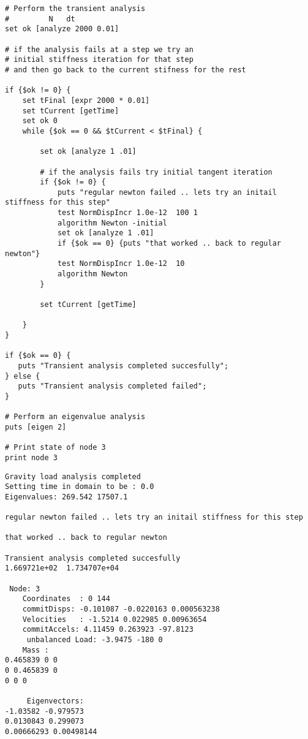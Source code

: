 \documentclass[12pt]{article}
\begin{document}
{\begin{verbatim}
# Perform the transient analysis
#         N   dt
set ok [analyze 2000 0.01]

# if the analysis fails at a step we try an
# initial stiffness iteration for that step
# and then go back to the current stifness for the rest

if {$ok != 0} {
    set tFinal [expr 2000 * 0.01]
    set tCurrent [getTime]
    set ok 0
    while {$ok == 0 && $tCurrent < $tFinal} {

        set ok [analyze 1 .01]

        # if the analysis fails try initial tangent iteration
        if {$ok != 0} {
            puts "regular newton failed .. lets try an initail stiffness for this step"
            test NormDispIncr 1.0e-12  100 1
            algorithm Newton -initial
            set ok [analyze 1 .01]
            if {$ok == 0} {puts "that worked .. back to regular newton"}
            test NormDispIncr 1.0e-12  10 
            algorithm Newton
        }
        
        set tCurrent [getTime]

    }
}

if {$ok == 0} {
   puts "Transient analysis completed succesfully";
} else {
   puts "Transient analysis completed failed";    
}

# Perform an eigenvalue analysis
puts [eigen 2]

# Print state of node 3
print node 3
\end{verbatim}
}


{\sf\small
\begin{verbatim}
Gravity load analysis completed
Setting time in domain to be : 0.0
Eigenvalues: 269.542 17507.1 

regular newton failed .. lets try an initail stiffness for this step

that worked .. back to regular newton

Transient analysis completed succesfully
1.669721e+02  1.734707e+04  

 Node: 3
	Coordinates  : 0 144 
	commitDisps: -0.101087 -0.0220163 0.000563238 
	Velocities   : -1.5214 0.022985 0.00963654 
	commitAccels: 4.11459 0.263923 -97.8123 
	 unbalanced Load: -3.9475 -180 0 
	Mass : 
0.465839 0 0 
0 0.465839 0 
0 0 0 

	 Eigenvectors: 
-1.03582 -0.979573 
0.0130843 0.299073 
0.00666293 0.00498144 

\end{verbatim}
}
\end{document}
